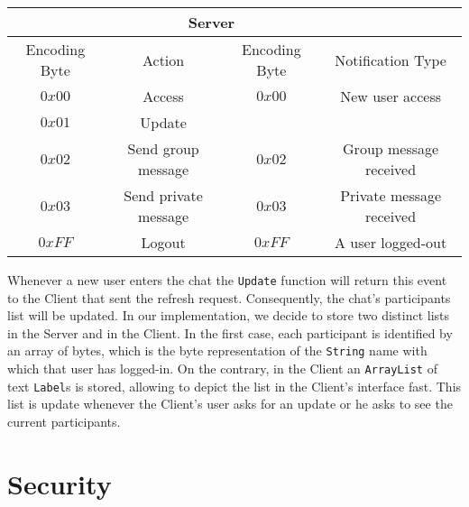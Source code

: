 \documentclass[12pt]{article}
\begin{document}
\noindent\begin{tabular}{|c|c||c|c|}
    \hline
    \rowcolor{gray!25}\multicolumn{2}{|c||}{Client} & \multicolumn{2}{c|}{Server}\\
    \hline
    \rowcolor{gray!25}Encoding Byte & Action & Encoding Byte & Notification Type\\
    \hline
    $0x00$ & Access & $0x00$ & New user access \\
    \hline
    $0x01$ & Update & &\\
    \hline
    $0x02$ & Send group message & $0x02$ & Group message received \\
    \hline
    $0x03$ & Send private message & $0x03$ & Private message received\\
    \hline
    $0xFF$ & Logout & $0xFF$ & A user logged-out\\
    \hline
\end{tabular} \bigskip

\noindent Whenever a new user enters the chat the \texttt{Update} function will return this event to the Client that sent the refresh request. Consequently, the chat's participants list will be updated. In our implementation, we decide to store two distinct lists in the Server and in the Client. In the first case, each participant is identified by an array of bytes, which is the byte representation of the \texttt{String} name with which that user has logged-in. On the contrary, in the Client an \texttt{ArrayList} of text \texttt{Label}s is stored, allowing to depict the list in the Client's interface fast. This list is update whenever the Client's user asks for an update or he asks to see the current participants.

\section{Security}
\end{document}
